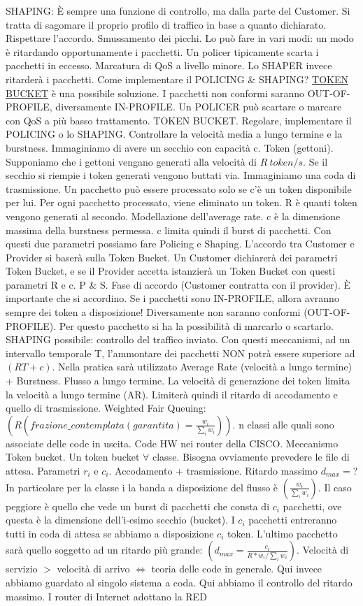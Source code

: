 SHAPING: \`E sempre una funzione di controllo, ma dalla parte del Customer. Si tratta di sagomare il proprio profilo di traffico in base a quanto dichiarato. Rispettare l'accordo. Smussamento dei picchi. Lo può fare in vari modi: un modo è ritardando opportunamente i pacchetti. Un policer tipicamente scarta i pacchetti in eccesso. Marcatura di QoS a livello minore. Lo SHAPER invece ritarderà i pacchetti. Come implementare il POLICING \& SHAPING? \underline{TOKEN BUCKET} è una possibile soluzione. I pacchetti non conformi saranno OUT-OF-PROFILE, diversamente IN-PROFILE. Un POLICER può scartare o marcare con QoS a più basso trattamento. TOKEN BUCKET. Regolare, implementare il POLICING o lo SHAPING. Controllare la velocità media a lungo termine e la burstness. Immaginiamo di avere un secchio con capacità c. Token (gettoni). Supponiamo che i gettoni vengano generati alla velocità di $R\ token/s$. Se il secchio si riempie i token generati vengono buttati via. Immaginiamo una coda di trasmissione. Un pacchetto può essere processato solo se c'è un token disponibile per lui. Per ogni pacchetto processato, viene eliminato un token. R è quanti token vengono generati al secondo. Modellazione dell'average rate. c è la dimensione massima della burstness permessa. c limita quindi il burst di pacchetti. Con questi due parametri possiamo fare Policing e Shaping. L'accordo tra Customer e Provider si baserà sulla Token Bucket. Un Customer dichiarerà dei parametri Token Bucket, e se il Provider accetta istanzierà un Token Bucket con questi parametri R e c. P \& S. Fase di accordo (Customer contratta con il provider). \`E importante che si accordino. Se i pacchetti sono IN-PROFILE, allora avranno sempre dei token a disposizione! Diversamente non saranno conformi (OUT-OF-PROFILE). Per questo pacchetto si ha la possibilità di marcarlo o scartarlo. SHAPING possibile: controllo del traffico inviato. Con questi meccanismi, ad un intervallo temporale T, l'ammontare dei pacchetti NON potrà essere superiore ad $(RT + c)$. Nella pratica sarà utilizzato Average Rate (velocità a lungo termine) + Burstness. Flusso a lungo termine. La velocità di generazione dei token limita la velocità a lungo termine (AR). Limiterà quindi il ritardo di accodamento e quello di trasmissione. Weighted Fair Queuing: $(R (frazione\_contemplata(garantita) = \frac{w_i}{\sum_i{w_i}}))$. n classi alle quali sono associate delle code in uscita. Code HW nei router della CISCO. Meccanismo Token bucket. Un token bucket $\forall$ classe. Bisogna ovviamente prevedere le file di attesa. Parametri $r_i$ e $c_i$. Accodamento + trasmissione. Ritardo massimo $d_{max} = ?$ In particolare per la classe i la banda a disposizione del flusso è $(\frac{w_i}{\sum_i{w_i}})$. Il caso peggiore è quello che vede un burst di pacchetti che consta di $c_i$ pacchetti, ove questa è la dimensione dell'i-esimo secchio (bucket). I $c_i$ pacchetti entreranno tutti in coda di attesa se abbiamo a disposizione $c_i$ token. L'ultimo pacchetto sarà quello soggetto ad un ritardo più grande: $(d_{max} = \frac{c_i}{R*w_i/{\sum_i{w_i}}})$. Velocità di servizio $>$ velocità di arrivo $\iff$ teoria delle code in generale. Qui invece abbiamo guardato al singolo sistema a coda. Qui abbiamo il controllo del ritardo massimo. I router di Internet adottano la RED  